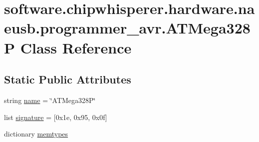 \hypertarget{classsoftware_1_1chipwhisperer_1_1hardware_1_1naeusb_1_1programmer__avr_1_1ATMega328P}{}\section{software.\+chipwhisperer.\+hardware.\+naeusb.\+programmer\+\_\+avr.\+A\+T\+Mega328\+P Class Reference}
\label{classsoftware_1_1chipwhisperer_1_1hardware_1_1naeusb_1_1programmer__avr_1_1ATMega328P}
\subsection*{Static Public Attributes}
\begin{DoxyCompactItemize}
\item 
string \hyperlink{classsoftware_1_1chipwhisperer_1_1hardware_1_1naeusb_1_1programmer__avr_1_1ATMega328P_a1f6e013caee19748d565156c6daec1e0}{name} = \char`\"{}A\+T\+Mega328\+P\char`\"{}
\item 
list \hyperlink{classsoftware_1_1chipwhisperer_1_1hardware_1_1naeusb_1_1programmer__avr_1_1ATMega328P_ad2acca9d8a96148c76e3d8997eea70cb}{signature} = \mbox{[}0x1e, 0x95, 0x0f\mbox{]}
\item 
dictionary \hyperlink{classsoftware_1_1chipwhisperer_1_1hardware_1_1naeusb_1_1programmer__avr_1_1ATMega328P_a54c1fe1122135857f90b8c2fddbd2c5f}{memtypes}
\end{DoxyCompactItemize}


